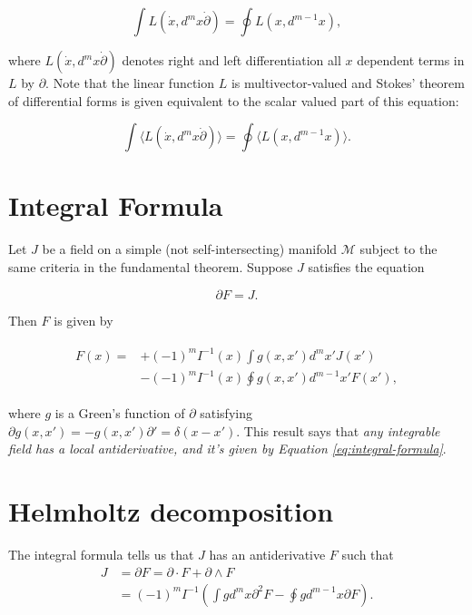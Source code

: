 \documentclass[twocolumn]{article}
\begin{document}
\begin{equation}
  \int L(\dot x, d^mx \dot \partial) = \oint L(x, d^{m-1}x),\label{eq:fundamental-theorem}
\end{equation}

where $L(\dot x, d^mx \dot \partial)$ denotes right and left differentiation all $x$ dependent terms in $L$ by $\partial$. Note that the linear function $L$ is multivector-valued and Stokes' theorem of differential forms is given equivalent to the scalar valued part of this equation:

\begin{equation}
  \int \langle L(\dot x, d^mx \dot \partial)\rangle = \oint \langle L(x, d^{m-1}x)\rangle.
\end{equation}

\section{Integral Formula}

Let $J$ be a field on a simple (not self-intersecting) manifold $\mathcal{M}$ subject to the same criteria in the fundamental theorem. Suppose $J$ satisfies the equation

\begin{equation}
  \partial F = J.
\end{equation}

Then $F$ is given by \cite{cagc}

\begin{align}
  \begin{split}
    F(x) = & +(-1)^{m} I^{-1}(x) \int g(x, x') d^{m}x' J(x') \\
    &- (-1)^{m} I^{-1}(x) \oint g(x, x') d^{m-1}x' F(x'),\label{eq:integral-formula}
  \end{split}
\end{align}

where $g$ is a Green's function of $\partial$ satisfying $\partial g(x,x') = - g(x, x') \partial' = \delta(x - x').$ This result says that \emph{any integrable field has a local antiderivative, and it's given by Equation \ref{eq:integral-formula}}.

\section{Helmholtz decomposition}

The integral formula tells us that $J$ has an antiderivative $F$ such that
\begin{align}
    J &= \partial F = \partial \cdot F + \partial \wedge F \\ 
      &= (-1)^m I^{-1} \left(\int g d^{m}x \partial^2 F - \oint g d^{m-1}x \partial F\right).\label{eq:helmholtz}
  \end{align}
\end{document}
